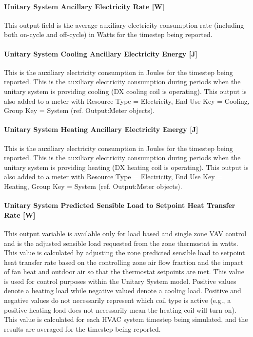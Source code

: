 \paragraph{Unitary System Ancillary Electricity Rate {[}W{]}}\label{unitary-system-ancillary-electric-power-w}

This output field is the average auxiliary electricity consumption rate (including both on-cycle and off-cycle) in Watts for the timestep being reported.

\paragraph{Unitary System Cooling Ancillary Electricity Energy {[}J{]}}\label{unitary-system-cooling-ancillary-electric-energy-j}

This is the auxiliary electricity consumption in Joules for the timestep being reported. This is the auxiliary electricity consumption during periods when the unitary system is providing cooling (DX cooling coil is operating). This output is also added to a meter with Resource Type = Electricity, End Use Key = Cooling, Group Key = System (ref. Output:Meter objects).

\paragraph{Unitary System Heating Ancillary Electricity Energy {[}J{]}}\label{unitary-system-heating-ancillary-electric-energy-j}

This is the auxiliary electricity consumption in Joules for the timestep being reported. This is the auxiliary electricity consumption during periods when the unitary system is providing heating (DX heating coil is operating). This output is also added to a meter with Resource Type = Electricity, End Use Key = Heating, Group Key = System (ref. Output:Meter objects).

\paragraph{Unitary System Predicted Sensible Load to Setpoint Heat Transfer Rate {[}W{]}}\label{unitary-system-sensible-load-to-setpoint-heat-transfer-rate-w}

This output variable is available only for load based and single zone VAV control and is the adjusted sensible load requested from the zone thermostat in watts. This value is calculated by adjusting the zone predicted sensible load to setpoint heat transfer rate based on the controlling zone air flow fraction and the impact of fan heat and outdoor air so that the thermostat setpoints are met. This value is used for control purposes within the Unitary System model. Positive values denote a heating load while negative valued denote a cooling load. Positive and negative values do not necessarily represent which coil type is active (e.g., a positive heating load does not necessarily mean the heating coil will turn on). This value is calculated for each HVAC system timestep being simulated, and the results are averaged for the timestep being reported.

